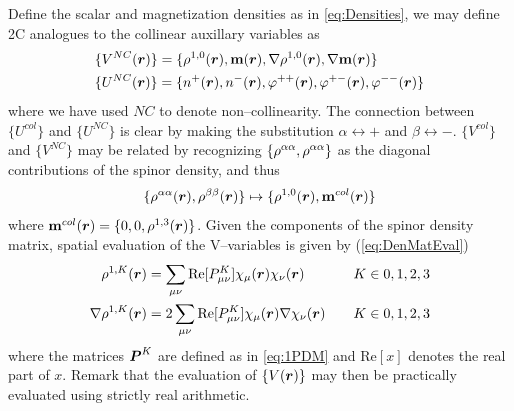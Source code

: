 Define the scalar and magnetization densities as in \cref{eq:Densities}, we may define 2C analogues
to the collinear auxillary variables as
\begin{align}
  \label{eq:NCAuxVar}
  &\{ V^{NC}(\boldsymbol{r}) \} = \{ \rho^{1,0}(\boldsymbol{r}), \mathbf{m}(\boldsymbol{r}), \nabla \rho^{1,0}(\boldsymbol{r}), \nabla \mathbf{m}(\boldsymbol{r}) \} \\
  &\{ U^{NC}(\boldsymbol{r}) \} = \{ n^+(\boldsymbol{r}), n^-(\boldsymbol{r}), \varphi^{++}(\boldsymbol{r}), \varphi^{+-}(\boldsymbol{r}), \varphi^{--}(\boldsymbol{r}) \}
\end{align}
where we have used $NC$ to denote non--collinearity. The connection between $\{U^{col}\}$ and $\{U^{NC}\}$
is clear by making the substitution $\alpha \leftrightarrow +$ and $\beta \leftrightarrow -$. 
$\{V^{col}\}$ and $\{V^{NC}\}$ may be related by recognizing $\{\rho^{\alpha\alpha},\rho^{\alpha\alpha}\}$ as the diagonal contributions
of the spinor density, and thus
\begin{equation}
  \{\rho^{\alpha\alpha}(\boldsymbol{r}), \rho^{\beta\beta}(\boldsymbol{r})\} \mapsto \{\rho^{1,0}(\boldsymbol{r}), \mathbf{m}^{col}(\boldsymbol{r})\}
\end{equation}
where $\mathbf{m}^{col}(\boldsymbol{r}) = \{0,0,\rho^{1,3}(\boldsymbol{r})\}$. Given the components of the spinor density matrix,
spatial evaluation of the V--variables is given by (\cref{eq:DenMatEval})
\begin{alignat}{2}
  \label{eq:VVarEval}
  \rho^{1,K}(\boldsymbol{r}) &= \sum_{\mu\nu} \mathrm{Re}[P^K_{\mu\nu}] \chi_\mu(\boldsymbol{r}) \chi_\nu(\boldsymbol{r}) \quad && K \in{0,1,2,3}\\
  \nabla\rho^{1,K}(\boldsymbol{r}) &= 2\sum_{\mu\nu} \mathrm{Re}[P^K_{\mu\nu}] \chi_\mu(\boldsymbol{r}) \nabla\chi_\nu(\boldsymbol{r})\quad && K \in{0,1,2,3}
\end{alignat}
where the matrices $\boldsymbol{P}^K$ are defined as in \cref{eq:1PDM} and $\mathrm{Re}[x]$ denotes the real part of $x$. Remark that the evaluation of $\{V(\boldsymbol{r})\}$ may then be practically 
evaluated using strictly real arithmetic.

